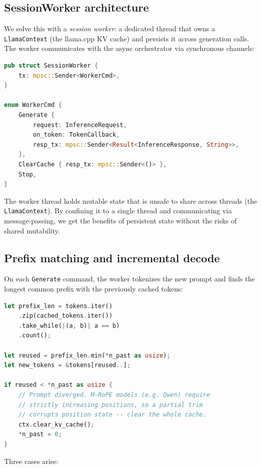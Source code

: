 \documentclass[11pt,a4paper]{article}
\begin{document}
\subsection{SessionWorker architecture}

We solve this with a \emph{session worker}: a dedicated thread that owns a \texttt{LlamaContext} (the llama.cpp KV cache) and persists it across generation calls. The worker communicates with the async orchestrator via synchronous channels:

\begin{lstlisting}[language=Rust, caption={SessionWorker channel protocol}]
pub struct SessionWorker {
    tx: mpsc::Sender<WorkerCmd>,
}

enum WorkerCmd {
    Generate {
        request: InferenceRequest,
        on_token: TokenCallback,
        resp_tx: mpsc::Sender<Result<InferenceResponse, String>>,
    },
    ClearCache { resp_tx: mpsc::Sender<()> },
    Stop,
}
\end{lstlisting}

\noindent The worker thread holds mutable state that is unsafe to share across threads (the \texttt{LlamaContext}). By confining it to a single thread and communicating via message-passing, we get the benefits of persistent state without the risks of shared mutability.

\subsection{Prefix matching and incremental decode}

On each \texttt{Generate} command, the worker tokenizes the new prompt and finds the longest common prefix with the previously cached tokens:

\begin{lstlisting}[language=Rust, caption={Prefix matching and KV cache trimming}]
let prefix_len = tokens.iter()
    .zip(cached_tokens.iter())
    .take_while(|(a, b)| a == b)
    .count();

let reused = prefix_len.min(*n_past as usize);
let new_tokens = &tokens[reused..];

if reused < *n_past as usize {
    // Prompt diverged. M-RoPE models (e.g. Qwen) require
    // strictly increasing positions, so a partial trim
    // corrupts position state -- clear the whole cache.
    ctx.clear_kv_cache();
    *n_past = 0;
}
\end{lstlisting}

\noindent Three cases arise:
\end{document}
